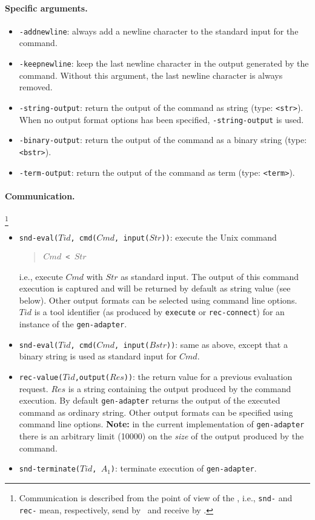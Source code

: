 \paragraph{Specific arguments.}
\begin{itemize}
\item {\tt -addnewline}: always add a newline character to the standard input for the command.
\item {\tt -keepnewline}: keep the last newline character
in the output generated by the command. Without this argument, 
the last newline character is always removed.
\item \texttt{-string-output}: return the output of the command as string
(type: \texttt{<str>}). When no output format options has been specified,
\texttt{-string-output} is used.
\item {\tt -binary-output}: return the output of the command
as a binary string (type: {\tt <bstr>}).
\item \texttt{-term-output}: return the output of the command as term (type:
\texttt{<term>}).
\end{itemize}

\paragraph{Communication.}  \hspace{-0.3cm}\footnote{Communication is described
from the point of view of the \TB, i.e., {\tt snd-} and {\tt rec-}
mean, respectively, send by \TB\ and receive by \TB.}

\begin{itemize}
\item {\tt snd-eval($Tid$, cmd($Cmd$, input($Str$))}: execute the Unix command
\begin{quote}
        {\tt $Cmd$ < $Str$}
\end{quote}
i.e., execute $Cmd$ with $Str$ as standard input. The output of this command execution
is captured and will be returned by default as string value (see below).
Other output formats can be selected using command line options.
$Tid$ is a tool identifier 
(as produced by {\tt execute} or {\tt rec-connect}) for an instance of the {\tt gen-adapter}.

\item {\tt snd-eval($Tid$, cmd($Cmd$, input($Bstr$))}: same as above, except that
a binary string is used as standard input for $Cmd$.

\item {\tt rec-value($Tid$,output($Res$))}: the return value for a previous evaluation request.
$Res$ is a string containing the output produced by the command execution.
By default \texttt{gen-adapter} returns the output of the executed command
as ordinary string. Other output formats can be specified using command line
options. {\bf Note:} in the current implementation of {\tt gen-adapter}
there is an arbitrary limit (10000) on the {\em size} of the output produced
by the command.

\item {\tt snd-terminate($Tid$, $A_1$)}: terminate execution of {\tt gen-adapter}.
\end{itemize}

